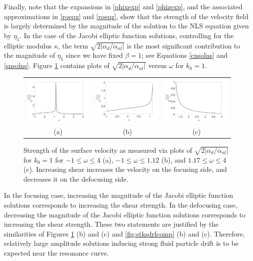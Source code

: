\documentclass{JFM_Style/jfm}
\begin{document}
Finally, note that the expansions in \eqref{phixexp} and \eqref{phizexp}, and the associated approximations in \eqref{roeqx} and \eqref{roeqz}, show that the strength of the velocity field is largely determined by the magnitude of the solution to the NLS equation given by $\eta_{1}$.  In the case of the Jacobi elliptic function solutions, controlling for the elliptic modulus $\kappa$, the term $\sqrt{2|\alpha_{d}/\alpha_{nl}|}$ is the most significant contribution to the magnitude of $\eta_{1}$ since we have fixed $\beta=1$; see Equations \eqref{cnsolns} and \eqref{snsolns}.  Figure \ref{fig:ampcomps} contains plots of $\sqrt{2|\alpha_{d}/\alpha_{nl}|}$ versus $\omega$ for $k_0=1$.
\begin{figure}
\centering
\begin{tabular}{ccc}
\includegraphics[width=.32\textwidth]{amp_factor_k0_1_wide_range} & \includegraphics[width=.32\textwidth]{amp_factor_k0_1_n1_to_1pt12} & \includegraphics[width=.32\textwidth]{amp_factor_k0_1_1pt2_to_4}\\
(a) & (b) & (c)
\end{tabular}
\caption{\small Strength of the surface velocity as measured via plots of $\sqrt{2|\alpha_{d}/\alpha_{nl}|}$ for $k_{0}=1$ for $-1\leq \omega \leq 4$ (a), $-1\leq \omega \leq 1.12$ (b), and $1.17\leq \omega \leq 4$ (c).  Increasing shear increases the velocity on the focusing side, and decreases it on the defocusing side.}
\label{fig:ampcomps}
\end{figure}
In the focusing case, increasing the magnitude of the Jacobi elliptic function solutions corresponds to increasing the shear strength.  In the defocusing case, decreasing the magnitude of the Jacobi elliptic function solutions corresponds to increasing the shear strength.  These two statements are justified by the similarities of Figures \ref{fig:ampcomps} (b) and (c) and \ref{fig:stksdrfcomp} (b) and (c).  Therefore, relatively large amplitude solutions inducing strong fluid particle drift is to be expected near the resonance curve.  
\end{document}
